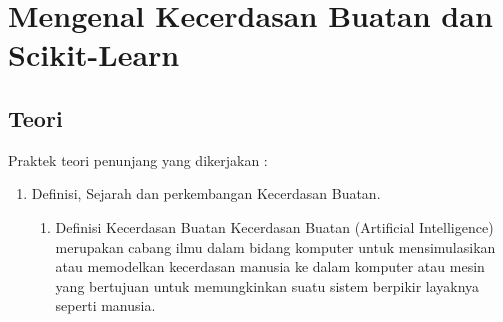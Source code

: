 \chapter{Mengenal Kecerdasan Buatan dan Scikit-Learn}

\section{Teori}
Praktek teori penunjang yang dikerjakan :
\begin{enumerate}
\item
Definisi, Sejarah dan perkembangan Kecerdasan Buatan.

	\begin{enumerate}
		\item Definisi Kecerdasan Buatan
		\newline Kecerdasan Buatan (Artificial Intelligence) merupakan cabang ilmu dalam bidang komputer untuk mensimulasikan atau memodelkan kecerdasan manusia ke dalam komputer atau mesin yang bertujuan untuk memungkinkan suatu sistem berpikir layaknya seperti manusia.
		

\end{enumerate}
\end{enumerate}
